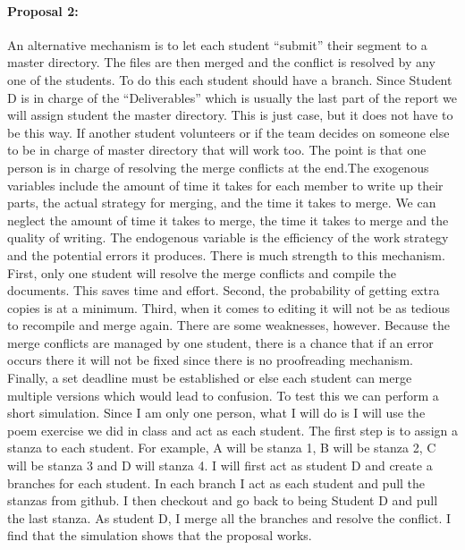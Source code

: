 \documentclass[12pt]{article}
\begin{document}
\paragraph {Proposal 2: }
An alternative mechanism is to let each student “submit” their segment to a master directory.  The files are then merged and the conflict is resolved by any one of the students. To do this each student should have a branch. Since Student D is in charge of the “Deliverables” which is usually the last part of the report we will assign student the master directory. This is just case, but it does not have to be this way. If another student volunteers or if the team decides on someone else to be in charge of master directory that will work too. The point is that one person is in charge of resolving the merge conflicts at the end.The exogenous variables include the amount of time it takes for each member to write up their parts, the actual strategy for merging, and the time it takes to merge. We can neglect the amount of time it takes to merge, the time it takes to merge and the quality of writing. The endogenous variable is the efficiency of the work strategy and the potential errors it produces. 
\newline 
\newline 
There is much strength to this mechanism. First, only one student will resolve the merge conflicts and compile the documents. This saves time and effort.  Second, the probability of getting extra copies is at a minimum. Third, when it comes to editing it will not be as tedious to recompile and merge again. There are some weaknesses, however.  Because the merge conflicts are managed by one student, there is a chance that if an error occurs there it will not be fixed since there is no proofreading mechanism. Finally, a set deadline must be established or else each student can merge multiple versions which would lead to confusion. 
\newline 
\newline 
To test this we can perform a short simulation. Since I am only one person, what I will do is I will use the poem exercise we did in class and act as each student. The first step is to assign a stanza to each student. For example, A will be stanza 1, B will be stanza 2, C will be stanza 3 and D will stanza 4.  I will first act as student D and create a branches for each student. In each branch I act as each student and pull the stanzas from github. I then checkout and go back to being Student D and pull the last stanza. As student D, I merge all the branches and resolve the conflict. I find that the simulation shows that the proposal works. 
\end{document}

